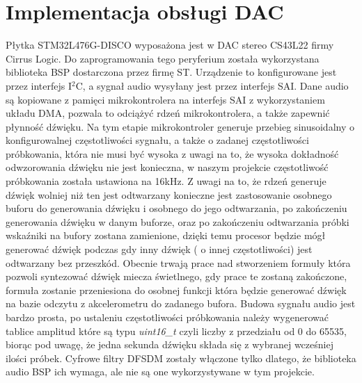 \documentclass[10pt, a4paper]{article}
\begin{document}
	\section{Implementacja obsługi DAC}
Płytka STM32L476G-DISCO wyposażona jest w DAC stereo CS43L22 firmy Cirrus Logic. Do zaprogramowania tego peryferium została wykorzystana biblioteka BSP dostarczona przez firmę ST. Urządzenie to konfigurowane jest przez interfejs I$^2$C, a sygnał audio wysyłany jest przez interfejs SAI. Dane audio są kopiowane z pamięci mikrokontrolera na interfejs SAI z wykorzystaniem układu DMA, pozwala to odciążyć rdzeń mikrokontrolera, a także zapewnić płynność dźwięku. Na tym etapie mikrokontroler generuje przebieg sinusoidalny o konfigurowalnej częstotliwości sygnału, a także o zadanej częstotliwości próbkowania, która nie musi być wysoka z uwagi na to, że wysoka dokładność odwzorowania dźwięku nie jest konieczna, w naszym projekcie częstotliwość próbkowania została ustawiona na 16kHz. Z uwagi na to, że rdzeń generuje dźwięk wolniej niż ten jest odtwarzany konieczne jest zastosowanie osobnego buforu do generowania dźwięku i osobnego do jego odtwarzania, po zakończeniu generowania dźwięku w danym buforze, oraz po zakończeniu odtwarzania próbki wskaźniki na bufory zostana zamienione, dzięki temu procesor będzie mógł generować dźwięk podczas gdy inny dźwięk ( o innej częstotliwości) jest odtwarzany bez przeszkód. Obecnie trwają prace nad stworzeniem formuły która pozwoli syntezować dźwięk miecza świetlnego, gdy prace te zostaną zakończone, formuła zostanie przeniesiona do osobnej funkcji która będzie generować dźwięk na bazie odczytu z akcelerometru do zadanego bufora. Budowa sygnału audio jest bardzo prosta, po ustaleniu częstotliwości próbkowania należy wygenerować tablice amplitud które są typu \textit{uint16\_t} czyli liczby z przedziału od 0 do 65535, biorąc pod uwagę, że jedna sekunda dźwięku składa się z wybranej wcześniej ilości próbek. Cyfrowe filtry DFSDM zostały włączone tylko dlatego, że biblioteka audio BSP ich wymaga, ale nie są one wykorzystywane w tym projekcie.
\end{document}
